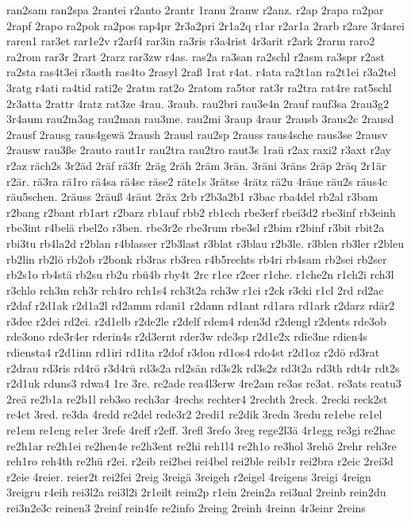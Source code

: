 {ran2sam
ran2spa
2rantei
r2anto
2rantr
1ranu
2ranw
r2anz.
r2ap
2rapa
ra2par
2rapf
2rapo
ra2pok
ra2pos
rap4pr
2r3a2pri
2r1a2q
r1ar
r2ar1a
2rarb
r2are
3r4arei
raren1
rar3et
rar1e2v
r2arf4
rar3in
ra3ris
r3a4rist
4r3arit
r2ark
2rarm
raro2
ra2rom
rar3r
2rart
2rarz
rar3zw
r4as.
ras2a
ra3san
ra2schl
r2asm
ra3spr
r2ast
ra2sta
ras4t3ei
r3asth
ras4to
2rasyl
2raß
1rat
r4at.
r4ata
ra2t1an
ra2t1ei
r3a2tel
3ratg
r4ati
ra4tid
rati2e
2ratm
rat2o
2ratom
ra5tor
rat3r
ra2tra
rat4re
rat5schl
2r3atta
2rattr
4ratz
rat3ze
4rau.
3raub.
rau2bri
rau3e4n
2rauf
rauf3sa
2rau3g2
3r4aum
rau2m3ag
rau2man
rau3me.
rau2mi
3raup
4raur
2rausb
3raus2c
2rausd
2rausf
2rausg
raus4gewä
2raush
2rausl
rau2sp
2rauss
raus4sche
raus3se
2rausv
2rausw
rau3ße
2rauto
raut1r
rau2tra
rau2tro
raut3s
1raü
r2ax
raxi2
r3axt
r2ay
r2az
räch2s
3r2äd
2räf
rä3fr
2räg
2räh
2räm
3rän.
3räni
3räns
2räp
2räq
2r1är
r2är.
rä3ra
rä1ro
rä4sa
rä4sc
räse2
räte1s
3rätse
4rätz
rä2u
4räue
räu2s
räus4c
räu5schen.
2räuss
2räuß
4räut
2räx
2rb
r2b3a2b1
r3bac
rba4del
rb2al
r3bam
r2bang
r2bant
rb1art
r2barz
rb1auf
rbb2
rb1ech
rbe3erf
rbei3d2
rbe3inf
rb3einh
rbe3int
r4belä
rbel2o
r3ben.
rbe3r2e
rbe3rum
rbe3sl
r2bim
r2binf
r3bit
rbit2a
rbi3tu
rb4la2d
r2blan
r4blasser
r2b3last
r3blat
r3blau
r2b3le.
r3blen
rb3ler
r2bleu
rb2lin
rb2lö
rb2ob
r2bonk
rb3ras
rb3rea
r4b5rechts
rb4ri
rb4sam
rb2sei
rb2ser
rb2s1o
rb4stä
rb2su
rb2u
rbü4b
rby4t
2rc
r1ce
r2cer
r1che.
r1che2n
r1ch2i
rch3l
r3chlo
rch3m
rch3r
rch4ro
rch1s4
rch3t2a
rch3w
r1ci
r2ck
r3cki
r1cl
2rd
rd2ac
r2daf
r2d1ak
r2d1a2l
rd2amm
rdani1
r2dann
rd1ant
rd1ara
rd1ark
r2darz
rdär2
r3dee
r2dei
rd2ei.
r2d1elb
r2de2le
r2delf
rdem4
rden3d
r2dengl
r2dents
rde3ob
rde3ono
rde3r4er
rderin4s
r2d3ernt
rder3w
rde3sp
r2d1e2x
rdie3ne
rdien4s
rdiensta4
r2d1inn
rd1iri
rd1ita
r2dof
r3don
rd1os4
rdo4st
r2d1oz
r2dö
rd3rat
r2drau
rd3ris
rd4rö
r3d4rü
rd3s2a
rd2sän
rd3s2k
rd3s2z
rd3t2a
rd3th
rdt4r
rdt2s
r2d1uk
rduns3
rdwa4
1re
3re.
re2ade
rea4l3erw
4re2am
re3as
re3at.
re3ats
reatu3
2reä
re2b1a
re2b1l
reb3so
rech3ar
4rechs
rechter4
2rechth
2reck.
2recki
reck2st
re4ct
3red.
re3da
4redd
re2del
rede3r2
2redi1
re2dik
3redn
3redu
re1ebe
re1el
re1em
re1eng
re1er
3refe
4reff
r2eff.
3refl
3refo
3reg
rege2l3ä
4r1egg
re3gi
re2hac
re2h1ar
re2h1ei
re2hen4e
re2h3ent
re2hi
reh1l4
re2h1o
re3hol
3rehö
2rehr
reh3re
reh1ro
reh4th
re2hü
r2ei.
r2eib
rei2bei
rei4bel
rei2ble
reib1r
rei2bra
r2eic
2rei3d
r2eie
4reier.
reier2t
rei2fei
2reig
3reigä
3reigeh
r2eigel
4reigens
3reigi
4reign
3reigru
r4eih
rei3l2a
rei3l2i
2r1eilt
reim2p
r1ein
2rein2a
rei3nal
2reinb
rein2du
rei3n2e3c
reinen3
2reinf
rein4fe
re2info
2reing
2reinh
4reinn
4r3einr
2reins
}
